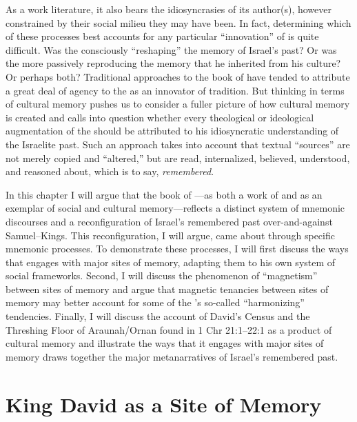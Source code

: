 As a work literature, it also bears the idiosyncrasies of its author(s), however constrained by their social milieu they may have been. In fact, determining which of these processes best accounts for any particular ``innovation'' of \chronicles is quite difficult. Was the \chronicler consciously ``reshaping'' the memory of Israel's past? Or was the \chronicler more passively reproducing the memory that he inherited from his culture? Or perhaps both? Traditional approaches to the book of \chronicles have tended to attribute a great deal of agency to the \chronicler as an innovator of tradition. But thinking in terms of cultural memory pushes us to consider a fuller picture of how cultural memory is created and calls into question whether every theological or ideological augmentation of the \chronicler should be attributed to his idiosyncratic understanding of the Israelite past. Such an approach takes into account that textual ``sources'' are not merely copied and ``altered,'' but are read, internalized, believed, understood, and reasoned about, which is to say, \emph{remembered}.

In this chapter I will argue that the book of \chronicles---as both a work of \rwb and as an exemplar of social and cultural memory---reflects a distinct system of mnemonic discourses and a reconfiguration of Israel's remembered past over-and-against Samuel--Kings. This reconfiguration, I will argue, came about through specific mnemonic processes.  To demonstrate these processes, I will first discuss the ways that \chronicles engages with major sites of memory, adapting them to his own system of social frameworks. Second, I will discuss the phenomenon of ``magnetism'' between sites of memory and argue that magnetic tenancies between sites of memory may better account for some of the \chronicler's so-called ``harmonizing'' tendencies. Finally, I will discuss the account of David's Census and the Threshing Floor of Araunah/Ornan found in 1 Chr 21:1--22:1 as a product of cultural memory and illustrate the ways that it engages with major sites of memory draws together the major metanarratives of Israel's remembered past.


\section{King David as a Site of Memory}

